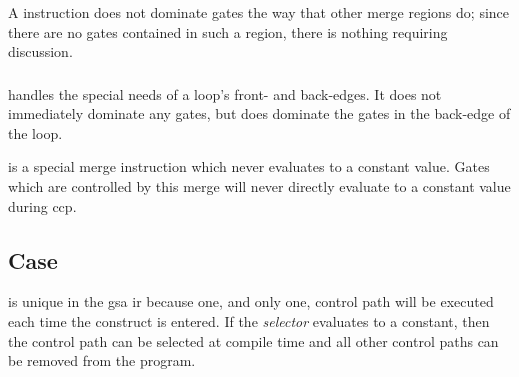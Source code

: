 
\subsubsection{}

A  instruction does not dominate gates the way that
other merge regions do; since there are no gates contained in such a
region, there is nothing requiring discussion.

\subsubsection{}

\begin{observation}
   handles the special needs of a loop's front-
  and back-edges.  It does not immediately dominate any gates, but
  does dominate the gates in the back-edge of the loop.
\end{observation}

 is a special merge instruction which never
evaluates to a constant value.  Gates which are controlled by this
merge will never directly evaluate to a constant value during
\ac{ccp}.


\subsubsection{}

\subsection{Case}\label{const-prop:classification-of-case}

 is unique in the \ac{gsa} \ac{ir}
because one, and only one, control path will be executed each time the
construct is entered.  If the \emph{selector} evaluates to a constant,
then the control path can be selected at compile time and all other
control paths can be removed from the program.


